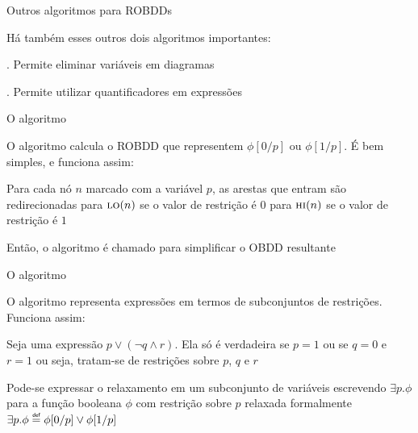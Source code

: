 \expandafter\documentclass\expandafter[table, usenames, svgnames, dvipsnames,14pt, \classopts]{beamer}
\newcommand\defeq{\mathrel{\overset{\makebox[0pt]{\mbox{\normalfont\tiny\sffamily def}}}{=}}}
\begin{document}
\begin{frame}{Outros algoritmos para ROBDDs}

    Há também esses outros dois algoritmos importantes:
    
    \begin{outline}
        \1 . Permite eliminar variáveis em diagramas
            
        \1 . Permite utilizar quantificadores em expressões
    \end{outline}

\end{frame}

\begin{frame}{O algoritmo }

    \small
    O algoritmo  calcula o ROBDD que representem $\phi[0/p]$ ou $\phi[1/p]$. É bem simples, e funciona assim:

    \begin{outline}
        \1 Para cada nó $n$ marcado com a variável $p$, as arestas que entram são redirecionadas
            \2[-] para $\Call{lo}{n}$ se o valor de restrição é $0$
            \2[-] para $\Call{hi}{n}$ se o valor de restrição é $1$
            
        \vspace{1em}
            
        \1 Então, o algoritmo  é chamado para simplificar o OBDD resultante
        
    \end{outline}

\end{frame}

\begin{frame}{O algoritmo }

    \small
    O algoritmo  representa expressões em termos de subconjuntos de restrições. Funciona assim:

    \begin{outline}
        \1 Seja uma expressão $p \lor (\lnot{q} \land r)$. Ela só é verdadeira se $p = 1$ ou se $q = 0$ e $r = 1$
            \2[-] ou seja, tratam-se de restrições sobre $p$, $q$ e $r$
            
        \vspace{1em}
            
        \1 Pode-se expressar o relaxamento em um subconjunto de variáveis
            \2[-] escrevendo $\exists{p.\phi}$ para a função booleana $\phi$ com restrição sobre $p$ relaxada
            \2[-] formalmente $\exists{p.\phi} \defeq \phi[0/p] \lor \phi[1/p]$
        
    \end{outline}

\end{frame}
\end{document}
